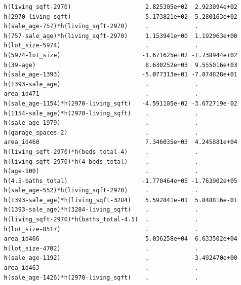 \documentclass[
]{article}
\begin{document}
\begin{verbatim}
h(living_sqft-2970)                     2.825305e+02  2.923094e+02
h(2970-living_sqft)                    -5.173821e+02 -5.280163e+02
h(sale_age-757)*h(living_sqft-2970)     .             .           
h(757-sale_age)*h(living_sqft-2970)     1.153941e+00  1.192063e+00
h(lot_size-5974)                        .             .           
h(5974-lot_size)                       -1.671625e+02 -1.738944e+02
h(39-age)                               8.630252e+03  9.555016e+03
h(sale_age-1393)                       -5.077313e+01 -7.874828e+01
h(1393-sale_age)                        .             .           
area_id471                              .             .           
h(sale_age-1154)*h(2970-living_sqft)   -4.591105e-02 -3.672719e-02
h(1154-sale_age)*h(2970-living_sqft)    .             .           
h(sale_age-1979)                        .             .           
h(garage_spaces-2)                      .             .           
area_id460                              7.346035e+03  4.245881e+04
h(living_sqft-2970)*h(beds_total-4)     .             .           
h(living_sqft-2970)*h(4-beds_total)     .             .           
h(age-100)                              .             .           
h(4.5-baths_total)                     -1.770464e+05 -1.763902e+05
h(sale_age-552)*h(living_sqft-2970)     .             .           
h(1393-sale_age)*h(living_sqft-3284)    5.592841e-01  5.848816e-01
h(1393-sale_age)*h(3284-living_sqft)    .             .           
h(living_sqft-2970)*h(baths_total-4.5)  .             .           
h(lot_size-8517)                        .             .           
area_id466                              5.036258e+04  6.633502e+04
h(lot_size-4702)                        .             .           
h(sale_age-1192)                        .            -3.492470e+00
area_id463                              .             .           
h(sale_age-1426)*h(2970-living_sqft)    .             .           
                                                                  

\end{verbatim}
\end{document}
